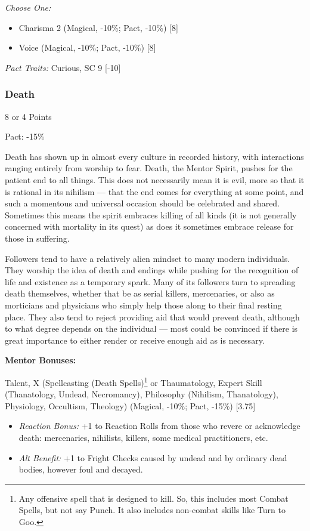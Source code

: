 \begin{multicols}{3}
	\textit{Choose One:}
	\begin{itemize}
		\itemsep 0pt
		\item Charisma 2 (Magical, -10\%; Pact, -10\%) [8]
		\item Voice (Magical, -10\%; Pact, -10\%) [8]
	\end{itemize}
	
	\textit{Pact Traits:} Curious, SC 9 [-10]
	
	\subsubsection{Death}
	\begin{flushright}
		8 or 4 Points
	\end{flushright}
	Pact: -15\%
	
	Death has shown up in almost every culture in recorded history, with interactions ranging entirely from worship to fear. Death, the Mentor Spirit, pushes for the patient end to all things. This does not necessarily mean it is evil, more so that it is rational in its nihilism — that the end comes for everything at some point, and such a momentous and universal occasion should be celebrated and shared. Sometimes this means the spirit embraces killing of all kinds (it is not generally concerned with mortality in its quest) as does it sometimes embrace release for those in suffering.
	
	Followers tend to have a relatively alien mindset to many modern individuals. They worship the idea of death and endings while pushing for the recognition of life and existence as a temporary spark. Many of its followers turn to spreading death themselves, whether that be as serial killers, mercenaries, or also as morticians and physicians who simply help those along to their final resting place. They also tend to reject providing aid that would prevent death, although to what degree depends on the individual — most could be convinced if there is great importance to either render or receive enough aid as is necessary.
	
	\textbf{Mentor Bonuses:} 
	
	Talent, X (Spellcasting (Death Spells)\footnote{Any offensive spell that is designed to kill. So, this includes most Combat Spells, but not say Punch. It also includes non-combat skills like Turn to Goo.} or Thaumatology, Expert Skill (Thanatology, Undead, Necromancy), Philosophy (Nihilism, Thanatology), Physiology, Occultism, Theology) (Magical, -10\%; Pact, -15\%) [3.75]
	\begin{itemize}
		\itemsep 0pt
		\item \textit{Reaction Bonus:} +1 to Reaction Rolls from those who revere or acknowledge death: mercenaries, nihilists, killers, some medical practitioners, etc.
		\item \textit{Alt Benefit:} +1 to Fright Checks caused by undead and by ordinary dead bodies, however foul and decayed.
	\end{itemize}
	

\end{multicols}
